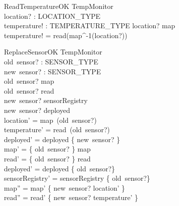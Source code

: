 \documentclass[12pt]{article}
\begin{document}
		
		\begin{schema}{ReadTemperatureOK}
			\Xi TempMonitor\\
			location? : LOCATION\_TYPE\\
			temperature! : TEMPERATURE\_TYPE
			\where
			location? \in \ran map\\
			temperature! = read(map^{-1}(location?))\\
		\end{schema}

        \begin{schema}{ReplaceSensorOK}
            \Delta TempMonitor \\
            old~sensor? : SENSOR\_TYPE \\
            new~sensor? : SENSOR\_TYPE \\
            \where
            old~sensor? \in \dom map \\
            old~sensor? \in \dom read \\
            new~sensor? \in \dom sensorRegistry \\
            new~sensor? \notin deployed \\
            location' = map~(old~sensor?) \\
            temperature' = read~(old~sensor?) \\
            deployed' = deployed \cup \{ new~sensor? \} \\
            map' = \{ old~sensor? \} \dsub map \\
            read' = \{ old~sensor? \} \dsub read \\
            deployed' = deployed \setminus \{ old~sensor?\} \\
            sensorRegistry' = sensorRegistry \setminus \{ old~sensor?\} \\
            map'' = map' \cup \{ new~sensor? \mapsto location' \} \\
            read'' = read' \cup \{ new~sensor? \mapsto temperature' \}
        \end{schema}
        
\end{document}
